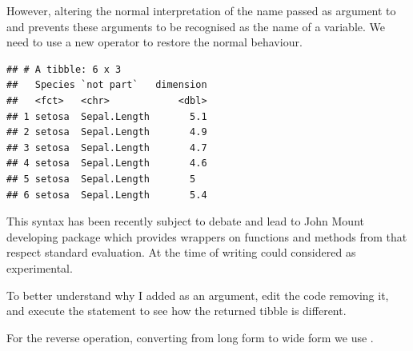 \documentclass[krantz2]{krantz}\usepackage{knitr}%
\begin{document}
\begin{warningbox}
However, altering the normal interpretation of the name passed as argument to  and  prevents these arguments to be recognised as the name of a variable. We need to use a new operator \code{!!} to restore the normal \Rlang behaviour.

\begin{knitrout}\footnotesize
{}\color{fgcolor}\begin{kframe}
\begin{alltt}
 \hlkwb{<-} 
 \hlkwb{<-}   \hlstd{=} \hlopt{!!}   \hlopt{-}
\end{alltt}
\begin{verbatim}
## # A tibble: 6 x 3
##   Species `not part`   dimension
##   <fct>   <chr>            <dbl>
## 1 setosa  Sepal.Length       5.1
## 2 setosa  Sepal.Length       4.9
## 3 setosa  Sepal.Length       4.7
## 4 setosa  Sepal.Length       4.6
## 5 setosa  Sepal.Length       5  
## 6 setosa  Sepal.Length       5.4
\end{verbatim}
\end{kframe}
\end{knitrout}

This syntax has been recently subject to debate and lead to John Mount developing package  which provides wrappers on functions and methods from  that respect standard evaluation. At the time of writing  could considered as experimental.
\end{warningbox}

\begin{playground}
To better understand why I added  as an argument, edit the code removing it, and execute the statement to see how the returned tibble is different.
\end{playground}

For the reverse operation, converting from long form to wide form we use .

\begin{knitrout}\footnotesize
{}\color{fgcolor}\begin{kframe}
\begin{alltt}
  \hlstd{=} \hlstd{(}\hlopt{!!}   
\end{alltt}
\end{kframe}
\end{knitrout}
\end{document}
